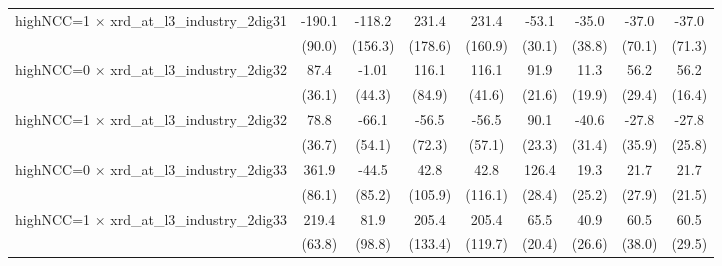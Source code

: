 {\begin{tabular}{l*{8}{c}}
\addlinespace
highNCC=1 $\times$ xrd\_at\_l3\_industry\_2dig31&      -190.1\sym{**} &      -118.2         &       231.4         &       231.4         &       -53.1\sym{*}  &       -35.0         &       -37.0         &       -37.0         \\
                    &      (90.0)         &     (156.3)         &     (178.6)         &     (160.9)         &      (30.1)         &      (38.8)         &      (70.1)         &      (71.3)         \\
\addlinespace
highNCC=0 $\times$ xrd\_at\_l3\_industry\_2dig32&        87.4\sym{**} &       -1.01         &       116.1         &       116.1\sym{***}&        91.9\sym{***}&        11.3         &        56.2\sym{*}  &        56.2\sym{***}\\
                    &      (36.1)         &      (44.3)         &      (84.9)         &      (41.6)         &      (21.6)         &      (19.9)         &      (29.4)         &      (16.4)         \\
\addlinespace
highNCC=1 $\times$ xrd\_at\_l3\_industry\_2dig32&        78.8\sym{**} &       -66.1         &       -56.5         &       -56.5         &        90.1\sym{***}&       -40.6         &       -27.8         &       -27.8         \\
                    &      (36.7)         &      (54.1)         &      (72.3)         &      (57.1)         &      (23.3)         &      (31.4)         &      (35.9)         &      (25.8)         \\
\addlinespace
highNCC=0 $\times$ xrd\_at\_l3\_industry\_2dig33&       361.9\sym{***}&       -44.5         &        42.8         &        42.8         &       126.4\sym{***}&        19.3         &        21.7         &        21.7         \\
                    &      (86.1)         &      (85.2)         &     (105.9)         &     (116.1)         &      (28.4)         &      (25.2)         &      (27.9)         &      (21.5)         \\
\addlinespace
highNCC=1 $\times$ xrd\_at\_l3\_industry\_2dig33&       219.4\sym{***}&        81.9         &       205.4         &       205.4\sym{*}  &        65.5\sym{***}&        40.9         &        60.5         &        60.5\sym{**} \\
                    &      (63.8)         &      (98.8)         &     (133.4)         &     (119.7)         &      (20.4)         &      (26.6)         &      (38.0)         &      (29.5)         \\

\end{tabular}}
